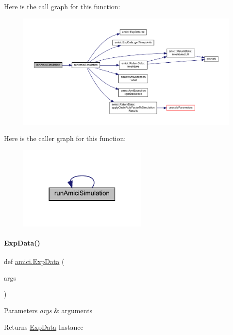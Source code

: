 Here is the call graph for this function\+:
\nopagebreak
\begin{figure}[H]
\begin{center}
\leavevmode
\includegraphics[width=350pt]{namespaceamici_a9501315e2c79e5787a62c57c05ffe7c0_cgraph}
\end{center}
\end{figure}
Here is the caller graph for this function\+:
\nopagebreak
\begin{figure}[H]
\begin{center}
\leavevmode
\includegraphics[width=182pt]{namespaceamici_a9501315e2c79e5787a62c57c05ffe7c0_icgraph}
\end{center}
\end{figure}
\mbox{\label{namespaceamici_a16e08939fd8d9ac0e61164a1a94acb05}} 
\paragraph{\texorpdfstring{Exp\+Data()}{ExpData()}}
{\footnotesize\ttfamily def \mbox{\hyperlink{classamici_1_1_exp_data}{amici.\+Exp\+Data}} (\begin{DoxyParamCaption}\item[{}]{args }\end{DoxyParamCaption})}


\begin{DoxyParams}{Parameters}
{\em args} & arguments\\
\hline
\end{DoxyParams}
\begin{DoxyReturn}{Returns}
\mbox{\hyperlink{classamici_1_1_exp_data}{Exp\+Data}} Instance 
\end{DoxyReturn}


